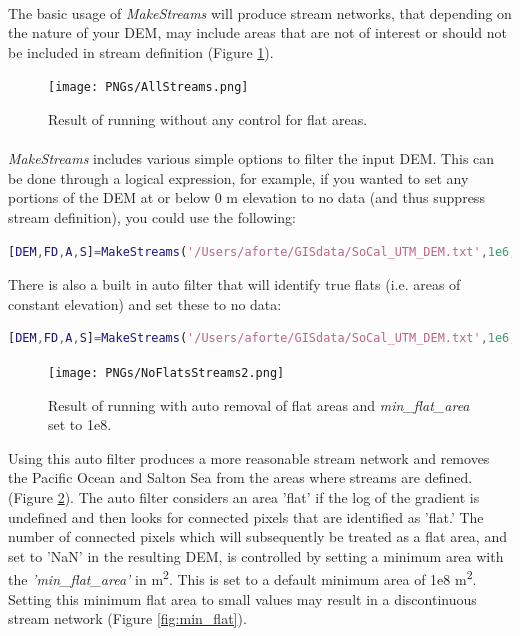 \paragraph{}The basic usage of \textit{MakeStreams} will produce stream networks, that depending on the nature of your DEM, may include areas that are not of interest or should not be included in stream definition (Figure \ref{fig:AllStreams}).

\begin{figure}[H]
	\texttt{[image: PNGs/AllStreams.png]}
	\caption{Result of running  without any control for flat areas.}
	\label{fig:AllStreams}
\end{figure}

\paragraph{}\textit{MakeStreams} includes various simple options to filter the input DEM. This can be done through a logical expression, for example, if you wanted to set any portions of the DEM at or below 0 m elevation to no data (and thus suppress stream definition), you could use the following:

\begin{lstlisting}[language=Matlab]
[DEM,FD,A,S]=MakeStreams('/Users/aforte/GISdata/SoCal_UTM_DEM.txt',1e6,'no_data_exp','DEM<=0');
\end{lstlisting}

\noindent
There is also a built in auto filter that will identify true flats (i.e. areas of constant elevation) and set these to no data:

\begin{lstlisting}[language=Matlab]
[DEM,FD,A,S]=MakeStreams('/Users/aforte/GISdata/SoCal_UTM_DEM.txt',1e6,'no_data_exp','auto');
\end{lstlisting}



\begin{figure}[H]
	\texttt{[image: PNGs/NoFlatsStreams2.png]}
	\caption{Result of running  with auto removal of flat areas and \textit{min\_flat\_area} set to 1e8.}
	\label{fig:NoFlatsStreams}
\end{figure}

\noindent
Using this auto filter produces a more reasonable stream network and removes the Pacific Ocean and Salton Sea from the areas where streams are defined. (Figure \ref{fig:NoFlatsStreams}). The auto filter considers an area 'flat' if the log of the gradient is undefined and then looks for connected pixels that are identified as 'flat.' The number of connected pixels which will subsequently be treated as a flat area, and set to 'NaN' in the resulting DEM, is controlled by setting a minimum area with the \textit{'min\_flat\_area'} in m\textsuperscript{2}. This is set to a default minimum area of 1e8 m\textsuperscript{2}. Setting this minimum flat area to small values may result in a discontinuous stream network (Figure \ref{fig:min_flat}).

